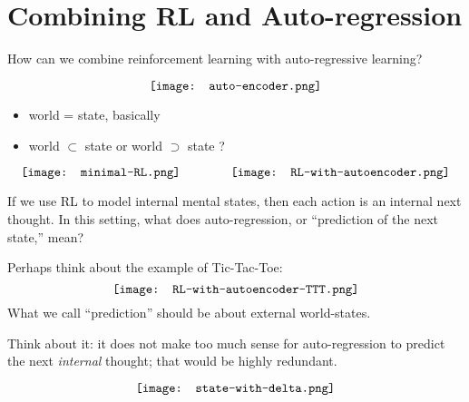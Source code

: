 \chapter{Combining RL and Auto-regression}
\label{chap:RL-Autoregression}

How can we combine reinforcement learning with auto-regressive learning?

\begin{equation}
	\vcenter{\hbox{\texttt{[image: auto-encoder.png]}}}
\end{equation}

\begin{itemize}
	\item world = state, basically
	\item world $\subset$ state or world $\supset$ state ?
\end{itemize}

\begin{equation}
\vcenter{\hbox{\texttt{[image: minimal-RL.png]}}}
\qquad \qquad
\vcenter{\hbox{\texttt{[image: RL-with-autoencoder.png]}}}
\end{equation}

If we use RL to model internal mental states, then each action is an internal next thought.  In this setting, what does auto-regression, or ``prediction of the next state,'' mean?

Perhaps think about the example of Tic-Tac-Toe:
\begin{equation}
\vcenter{\hbox{\texttt{[image: RL-with-autoencoder-TTT.png]}}}
\end{equation}
What we call ``prediction'' should be about external world-states.  

Think about it:  it does not make too much sense for auto-regression to predict the next \textit{internal} thought;  that would be highly redundant.



\begin{equation}
\vcenter{\hbox{\texttt{[image: state-with-delta.png]}}}
\end{equation}


